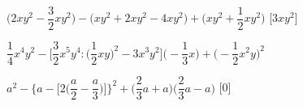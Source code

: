 \begin{esercizio}[\Ast]
\begin{enumeratea}
% 
% 
 \item 
\(\bigg(2xy^{2}-\dfrac{3}{2}xy^{2}\bigg)-\big(xy^{2}+2xy^{2}-4xy^{2}
\big)+\bigg(xy^{2}+\dfrac{1}{2}xy^{2}\bigg)\)
  \hfill[\(3xy^{2}\)]
 \item 
\(\dfrac{1}{4}x^{4}y^{2}-\bigg[\dfrac{3}{2}x^{5}y^{4}:\bigg(\dfrac{1}{2}xy\bigg)^
{2}-3x^{3}y^{2}\bigg]%
 \bigg(-{\dfrac{1}{3}}x\bigg)+\bigg(-{\dfrac{1}{2}}x^{2}y\bigg)^{2}\)
  \hfill{}
 \item 
\(a^{2}-\Bigg\{a-\bigg[2\bigg(\dfrac{a}{2}-\dfrac{a}{3}\bigg)\bigg]\Bigg\}^{2}+%
 \bigg(\dfrac{2}{3}a+a\bigg)\bigg(\dfrac{2}{3}a-a\bigg)\)
  \hfill[0]
%  
%  
%  
%  
% 
% 
% 

\end{enumeratea}
\end{esercizio}
